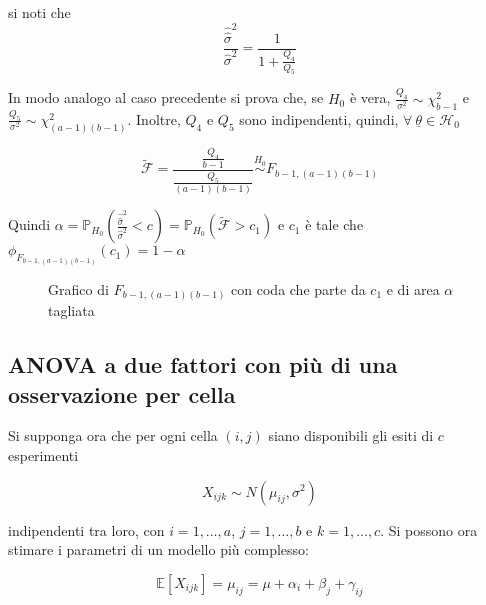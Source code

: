 \documentclass[hidelinks, 10pt]{report}
\begin{document}
si noti che
\[ \frac{\hat{\hat{\sigma}}^{2}}{\hat{\sigma}^{2}} = \frac{1}{1 + \frac{Q_{4}}{Q_{5}}} \]

In modo analogo al caso precedente si prova che, se $ H_{0} $ \`e vera, $ \frac{Q_{4}}{\sigma^{2}} \sim \chi^{2}_{b - 1} $ e $ \frac{Q_{5}}{\sigma^{2}} \sim \chi^{2}_{(a - 1)(b - 1)} $. Inoltre, $ Q_{4} $ e $ Q_{5} $ sono indipendenti, quindi, $ \forall\ \underline{\theta} \in \mathcal{H}_{0} $

\[ \tilde{\mathcal{F}} = \frac{\frac{Q_{4}}{b - 1}}{\frac{Q_{5}}{(a - 1)(b - 1)}} \stackrel{H_{0}}{\sim} F_{b - 1, (a - 1)(b - 1)} \]

Quindi $ \alpha = \mathbb{P}_{H_{0}} \left( \frac{\hat{\hat{\sigma}}^{2}}{\hat{\sigma}^{2}} < c \right) = \mathbb{P}_{H_{0}} \left( \tilde{\mathcal{F}} > c_{1} \right) $ e $ c_{1} $ \`e tale che $ \phi_{F_{b - 1, (a - 1)(b - 1)}} (c_{1}) = 1 - \alpha $

\begin{center}
\begin{figure}[H]
\caption{Grafico di $ F_{b - 1, (a - 1)(b - 1)} $ con coda che parte da $ c_{1} $ e di area $ \alpha $ tagliata}
\end{figure}
\end{center}

\subsection{ANOVA a due fattori con pi\`u di una osservazione per cella}
Si supponga ora che per ogni cella $ (i, j) $ siano disponibili gli esiti di $ c $ esperimenti

\[ X_{ijk} \sim N(\mu_{ij}, \sigma^{2}) \]

indipendenti tra loro, con $ i = 1, \dotsc, a $, $ j = 1, \dotsc, b $ e $ k = 1, \dotsc, c $. Si possono ora stimare i parametri di un modello pi\`u complesso:

\[ \mathbb{E}[X_{ijk}] = \mu_{ij} = \mu + \alpha_{i} + \beta_{j} + \gamma_{ij} \]
\end{document}
